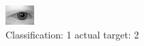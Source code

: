 \begin{figure}[h!]
\begin{center}
\includegraphics[width=0.60\columnwidth]{figures/ID355_class_1_target_2.png}
\end{center}
\caption{ Classification: 1 actual target: 2}
\label{fig:ID355_class_1_target_2}
\end{figure}
